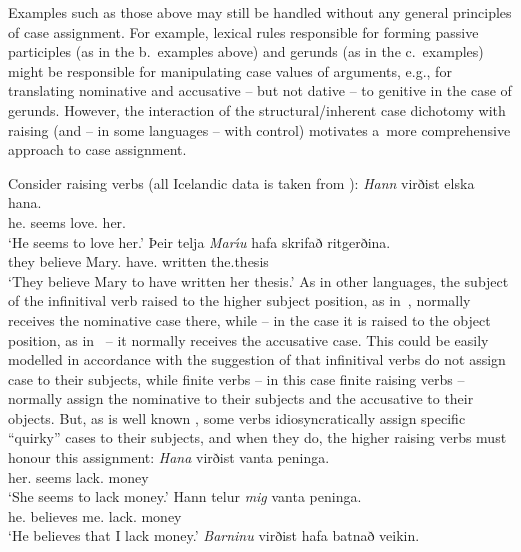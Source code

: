 \documentclass[output=paper
                ,modfonts
                ,nonflat
	        ,collection
	        ,collectionchapter
	        ,collectiontoclongg
 	        ,biblatex
                ,babelshorthands
                ,newtxmath
                ,draftmode
                ,colorlinks, citecolor=brown
]{./langsci/langscibook}
\begin{document}
Examples such as those above may still be handled without any general principles of case assignment.  For example, lexical rules \citep[209–218]{ps} responsible for forming passive participles (as in the b.~examples above) and gerunds (as in the c.~examples) might be responsible for manipulating case values of arguments, e.g., for translating nominative and accusative – but not dative – to genitive in the case of gerunds.  However, the interaction of the structural/inherent case dichotomy with raising (and – in some languages – with control) motivates a~more comprehensive approach to case assignment.

Consider  raising verbs (all Icelandic data is taken from \citealt[304–305]{SKG92}):
\eal
\label{isl:nom}
\ex
\gll \emph{Hann} virðist elska hana. \\
     he.\NOM{} seems love.\INF{} her.\ACC{}\\
\glt `He seems to love her.'
\ex
\gll Þeir telja \emph{Mar{\'\i}u} hafa skrifað ritgerðina. \\
     they believe Mary.\ACC{} have.\INF{} written the.thesis\\
\glt `They believe Mary to have written her thesis.'
\zl
As in other languages, the subject of the infinitival verb raised to the higher subject position, as in~, normally receives the nominative case there, while – in the case it is raised to the object position, as in~ – it normally receives the accusative case.  This could be easily modelled in accordance with the suggestion of \citet[30]{ps2} that infinitival verbs do not assign case to their subjects, while finite verbs – in this case finite raising verbs – normally assign the nominative to their subjects and the accusative to their objects.  But, as is well known \citep{Andrews82a-u-kopiert,zae:mal:83,ZMT85a}, some  verbs idiosyncratically assign specific “quirky” cases to their subjects, and when they do, the higher raising verbs must honour this assignment:
\eal\label{isl:acc}
\ex
\gll \emph{Hana} virðist vanta peninga. \\
      her.\ACC{} seems lack.\INF{} money\\
\glt `She seems to lack money.'
\ex
\gll Hann telur \emph{mig} vanta peninga. \\
      he.\NOM{} believes me.\ACC{} lack.\INF{} money\\
\glt `He believes that I lack money.'
\zl
\eal
\label{isl:dat}
\ex
\gll  \emph{Barninu} virðist hafa batnað veikin. \\
\end{document}
